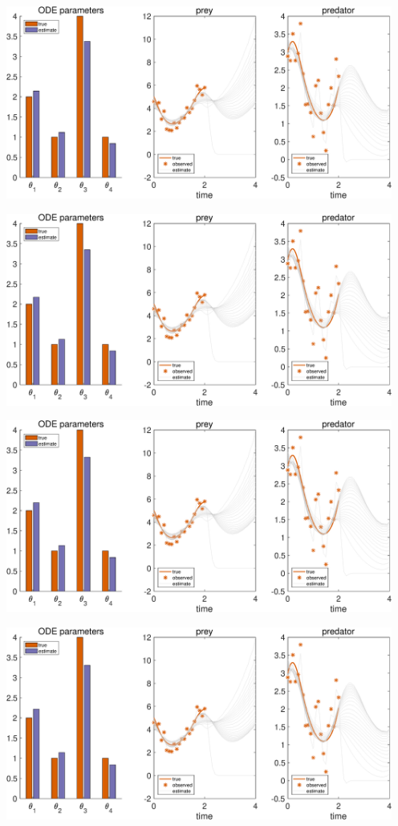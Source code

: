 {\includegraphics [width=5in]{Lotka_Volterra_3_25.eps}

\includegraphics [width=5in]{Lotka_Volterra_3_26.eps}

\includegraphics [width=5in]{Lotka_Volterra_3_27.eps}

\includegraphics [width=5in]{Lotka_Volterra_3_28.eps}

}
